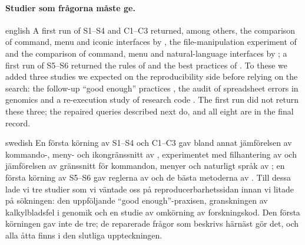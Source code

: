 \paragraph{%
  {Studier som frågorna måste ge.}} %
\begin{onlyin}{english} %
A first run of S1--S4 and C1--C3 returned, among others, the
comparison of command, menu and iconic interfaces by
\textcite{Whiteside1985User}, the file-manipulation experiment of
\textcite{Margono1995Study} and the comparison of command, menu and
natural-language interfaces by \textcite{Hauptmann1983Comparison}; a
first run of S5--S6 returned the rules of \textcite{Sandve2013Ten} and
the best practices of \textcite{Wilson2014Best}.  To these we added
three studies we expected on the reproducibility side before relying on
the search: the follow-up \enquote{good enough} practices
\autocite{Wilson2017Good}, the audit of spreadsheet errors in genomics
\autocite{Ziemann2016Gene} and a re-execution study of research code
\autocite{Trisovic2022Large}.  The first run did not return these
three; the repaired queries described next do, and all eight are in the
final record.
\end{onlyin}
\begin{onlyin}{swedish}
En första körning av S1--S4 och C1--C3 gav bland annat jämförelsen av
kommando-, meny- och ikongränssnitt av \textcite{Whiteside1985User},
experimentet med filhantering av \textcite{Margono1995Study} och
jämförelsen av gränssnitt för kommandon, menyer och naturligt språk av
\textcite{Hauptmann1983Comparison}; en första körning av S5--S6 gav
reglerna av \textcite{Sandve2013Ten} och de bästa metoderna av
\textcite{Wilson2014Best}.  Till dessa lade vi tre studier som vi
väntade oss på reproducerbarhetssidan innan vi litade på sökningen: den
uppföljande \enquote{good enough}-praxisen\autocite{Wilson2017Good},
granskningen av kalkylbladsfel i genomik\autocite{Ziemann2016Gene} och
en studie av omkörning av forskningskod\autocite{Trisovic2022Large}.
Den första körningen gav inte de tre; de reparerade frågor som beskrivs
härnäst gör det, och alla åtta finns i den slutliga uppteckningen.
\end{onlyin}

